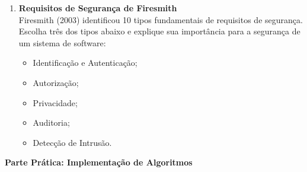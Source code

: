 \documentclass[12pt]{article}
\begin{document}
\begin{enumerate}[label=\textbf{Questão \arabic*:}, leftmargin=1.5cm, labelsep=0.5cm]
    \item \textbf{Requisitos de Segurança de Firesmith} \\
    Firesmith (2003) identificou 10 tipos fundamentais de requisitos de segurança. Escolha três dos tipos abaixo e explique sua importância para a segurança de um sistema de software:
    \begin{itemize}
        \item Identificação e Autenticação;
        \item Autorização;
        \item Privacidade;
        \item Auditoria;
        \item Detecção de Intrusão.
    \end{itemize}

\end{enumerate}

\vspace{0.5cm}
\begin{center}
    \textcolor{meuazul}{\Large \textbf{Parte Prática: Implementação de Algoritmos}}
\end{center}
\vspace{0.3cm}
\end{document}
